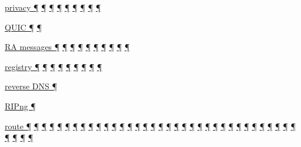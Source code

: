 \documentclass[
]{article}
\begin{document}
\hyperref[addresses]{privacy ¶} \hyperref[auto-configuration]{¶}
\hyperref[source-and-destination-address-selection]{¶}
\hyperref[ipv6-primary-differences-from-ipv4]{¶} \hyperref[security]{¶}
\hyperref[layer-2-considerations]{¶}
\hyperref[basic-windows-commands]{¶}
\hyperref[multi-prefix-operation]{¶} \hyperref[security-operation]{¶}

\hyperref[transport-protocols]{QUIC ¶} \hyperref[multihoming]{¶}

\hyperref[why-ipv6-is-so-complicated]{RA messages ¶}
\hyperref[address-resolution]{¶} \hyperref[auto-configuration]{¶}
\hyperref[managed-configuration]{¶} \hyperref[routing]{¶}
\hyperref[prefix-per-host]{¶} \hyperref[multi-prefix-operation]{¶}
\hyperref[advanced-troubleshooting]{¶} \hyperref[tools]{¶}
\hyperref[obsolete-features-in-ipv6]{¶}

\hyperref[addresses]{registry ¶} \hyperref[auto-configuration]{¶}
\hyperref[extension-headers-and-options]{¶} \hyperref[filtering]{¶}
\hyperref[address-planning]{¶} \hyperref[multi-prefix-operation]{¶}
\hyperref[multihoming]{¶} \hyperref[deployment-in-the-enterprise]{¶}
\hyperref[status]{¶}

\hyperref[dns]{reverse DNS ¶}

\hyperref[routing]{RIPng ¶}

\hyperref[why-ipv6-is-so-complicated]{route ¶}
\hyperref[why-version-6]{¶} \hyperref[ipv6-basic-technology]{¶}
\hyperref[address-resolution]{¶} \hyperref[addresses]{¶}
\hyperref[auto-configuration]{¶} \hyperref[dns]{¶}
\hyperref[extension-headers-and-options]{¶}
\hyperref[layer-2-functions]{¶} \hyperref[managed-configuration]{¶}
\hyperref[packet-format]{¶} \hyperref[routing]{¶}
\hyperref[traffic-class-and-flow-label]{¶}
\hyperref[coexistence-with-legacy-ipv4]{¶}
\hyperref[dual-stack-scenarios]{¶}
\hyperref[ipv6-primary-differences-from-ipv4]{¶}
\hyperref[translation-and-ipv4-as-a-service]{¶} \hyperref[tunnels]{¶}
\hyperref[filtering]{¶} \hyperref[layer-2-considerations]{¶}
\hyperref[topology-obfuscation]{¶} \hyperref[network-design]{¶}
\hyperref[address-planning]{¶} \hyperref[management-and-operations]{¶}
\hyperref[address-and-prefix-management]{¶}
\hyperref[energy-consumption]{¶} \hyperref[multi-prefix-operation]{¶}
\hyperref[multihoming]{¶} \hyperref[packet-size-and-jumbo-frames]{¶}
\hyperref[routing-operation]{¶} \hyperref[security-operation]{¶}
\hyperref[deployment-by-carriers]{¶}
\hyperref[deployment-in-the-enterprise]{¶}
\hyperref[deployment-in-the-home]{¶} \hyperref[troubleshooting]{¶}
\hyperref[advanced-troubleshooting]{¶} \hyperref[tools]{¶}
\hyperref[obsolete-features-in-ipv6]{¶} \hyperref[further-reading]{¶}
\end{document}
